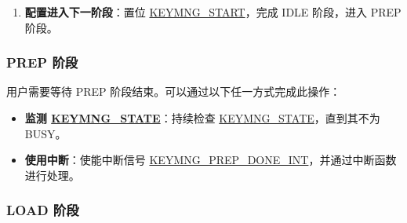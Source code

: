 \documentclass[main\_\_CN.tex]{subfiles}
\begin{document}
\begin{enumerate}
\begin{itemize}
        \item 3:  flash\_256\_key\_2
        \item 4:  flash\_128\_key
        \item 6:  hmac\_key
        \item 7:  dsa\_key
        \item 8:  psram\_256\_key\_1
        \item 9:  psram\_256\_key\_2
        \item 10: psram\_128\_key
        \item 其他值：无效
    \end{itemize}
    \item \textbf{配置进入下一阶段}：置位 \hyperref[fielddesc:KEYMNGSTART]{KEYMNG\_START}，完成 IDLE 阶段，进入 PREP 阶段。
\end{enumerate}

\subsubsection{PREP 阶段}

用户需要等待 PREP 阶段结束。可以通过以下任一方式完成此操作：
\begin{itemize}
    \item \textbf{监测 \hyperref[fielddesc:KEYMNGSTATE]{KEYMNG\_STATE}}：持续检查 \hyperref[fielddesc:KEYMNGSTATE]{KEYMNG\_STATE}，直到其不为 BUSY。
    \item \textbf{使用中断}：使能中断信号 \hyperref[int:KEYMNGPREPDONEINT]{KEYMNG\_PREP\_DONE\_INT}，并通过中断函数进行处理。
\end{itemize}

\subsubsection{LOAD 阶段}
\end{document}
